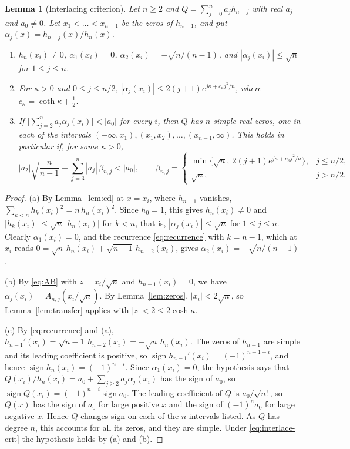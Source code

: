 \documentclass[11pt]{amsart}
\newtheorem{lemma}[theorem]{Lemma}
\theoremstyle{definition}
\theoremstyle{remark}
\numberwithin{equation}{section}
\begin{document}
\begin{lemma}[Interlacing criterion]\label{lem:interlace}
Let $n\ge2$ and $Q=\sum_{j=0}^{n}a_jh_{n-j}$ with real $a_j$ and $a_0\ne0$. Let $x_1<\dots<x_{n-1}$ be the zeros of $h_{n-1}$, and put $\alpha_j(x)=h_{n-j}(x)/h_n(x)$.
\begin{enumerate}
\item[(a)] $h_n(x_i)\ne0$, $\alpha_1(x_i)=0$, $\alpha_2(x_i)=-\sqrt{n/(n-1)}$, and $|\alpha_j(x_i)|\le\sqrt n$ for $1\le j\le n$.
\item[(b)] For $\kappa>0$ and $0\le j\le n/2$, $|\alpha_j(x_i)|\le2(j+1)e^{j\kappa+c_\kappa j^2/n}$, where $c_\kappa=\coth\kappa+\frac12$.
\item[(c)] If $\bigl|\sum_{j=2}^{n}a_j\alpha_j(x_i)\bigr|<|a_0|$ for every $i$, then $Q$ has $n$ simple real zeros, one in each of the intervals $(-\infty,x_1),(x_1,x_2),\dots,(x_{n-1},\infty)$. This holds in particular if, for some $\kappa>0$,
\begin{equation}\label{eq:interlace-crit}
|a_2|\sqrt{\frac n{n-1}}+\sum_{j=3}^{n}|a_j|\,\beta_{n,j}<|a_0|,\qquad
\beta_{n,j}=\begin{cases}\min\bigl\{\sqrt n,\ 2(j+1)e^{j\kappa+c_\kappa j^2/n}\bigr\},& j\le n/2,\\[2pt] \sqrt n,& j>n/2.\end{cases}
\end{equation}
\end{enumerate}
\end{lemma}

\begin{proof}
(a) By Lemma~\ref{lem:cd} at $x=x_i$, where $h_{n-1}$ vanishes, $\sum_{k<n}h_k(x_i)^2=n\,h_n(x_i)^2$. Since $h_0=1$, this gives $h_n(x_i)\ne0$ and $|h_k(x_i)|\le\sqrt n\,|h_n(x_i)|$ for $k<n$, that is, $|\alpha_j(x_i)|\le\sqrt n$ for $1\le j\le n$. Clearly $\alpha_1(x_i)=0$, and the recurrence \eqref{eq:recurrence} with $k=n-1$, which at $x_i$ reads $0=\sqrt n\,h_n(x_i)+\sqrt{n-1}\,h_{n-2}(x_i)$, gives $\alpha_2(x_i)=-\sqrt{n/(n-1)}$.

(b) By \eqref{eq:AB} with $z=x_i/\sqrt n$ and $h_{n-1}(x_i)=0$, we have $\alpha_j(x_i)=A_{n,j}(x_i/\sqrt n)$. By Lemma~\ref{lem:zeros}, $|x_i|<2\sqrt n$, so Lemma~\ref{lem:transfer} applies with $|z|<2\le2\cosh\kappa$.

(c) By \eqref{eq:recurrence} and (a), $h_{n-1}'(x_i)=\sqrt{n-1}\,h_{n-2}(x_i)=-\sqrt n\,h_n(x_i)$. The zeros of $h_{n-1}$ are simple and its leading coefficient is positive, so $\operatorname{sign}h_{n-1}'(x_i)=(-1)^{n-1-i}$, and hence $\operatorname{sign}h_n(x_i)=(-1)^{n-i}$. Since $\alpha_1(x_i)=0$, the hypothesis says that $Q(x_i)/h_n(x_i)=a_0+\sum_{j\ge2}a_j\alpha_j(x_i)$ has the sign of $a_0$, so $\operatorname{sign}Q(x_i)=(-1)^{n-i}\operatorname{sign}a_0$. The leading coefficient of $Q$ is $a_0/\sqrt{n!}$, so $Q(x)$ has the sign of $a_0$ for large positive $x$ and the sign of $(-1)^na_0$ for large negative $x$. Hence $Q$ changes sign on each of the $n$ intervals listed. As $Q$ has degree $n$, this accounts for all its zeros, and they are simple. Under \eqref{eq:interlace-crit} the hypothesis holds by (a) and (b).
\end{proof}
\end{document}
